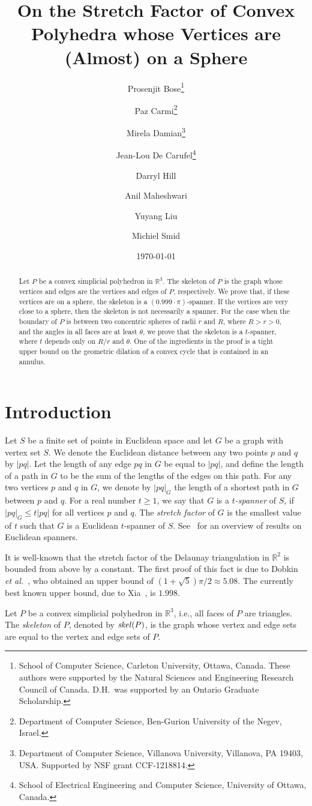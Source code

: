 \documentclass[12pt]{article}
\title{On the Stretch Factor of Convex Polyhedra whose Vertices are 
      (Almost) on a Sphere}
\author{
Prosenjit Bose\thanks{School of Computer Science, Carleton University, 
    Ottawa, Canada. These authors were supported by the 
    Natural Sciences and Engineering Research Council of Canada. 
    D.H.\ was supported by an Ontario Graduate Scholarship.}
\and 
Paz Carmi\thanks{Department of Computer Science, Ben-Gurion University 
   of the Negev, Israel.} 
\and 
Mirela Damian\thanks{Department of Computer Science, Villanova 
   University, Villanova, PA 19403, USA. Supported by NSF grant 
   CCF-1218814.}
\and 
Jean-Lou De Carufel\thanks{School of Electrical Engineering and 
    Computer Science, University of Ottawa, Canada.} 
\and  
Darryl Hill\footnotemark[1] 
\and 
Anil Maheshwari\footnotemark[1] 
\and
Yuyang Liu\footnotemark[1] 
\and 
Michiel Smid\footnotemark[1] 
}
\date{\today}
\newcommand{\IR}{\mathbb{R}}
\newcommand{\skel}{\mathord{\it skel}}
\begin{document}
 

\maketitle 

\begin{abstract} 
Let $P$ be a convex simplicial polyhedron in $\IR^3$. The skeleton of 
$P$ is the graph whose vertices and edges are the vertices and edges 
of $P$, respectively. We prove that, if these vertices are on a 
sphere, the skeleton is a $(0.999 \cdot \pi)$-spanner. If the 
vertices are very close to a sphere, then the skeleton is not 
necessarily a spanner. For the case when the boundary of $P$ is between 
two concentric spheres of radii $r$ and $R$, where $R>r>0$, and the 
angles in all faces are at least $\theta$, we prove that the skeleton 
is a $t$-spanner, where $t$ depends only on $R/r$ and $\theta$.  
One of the ingredients in the proof is a tight upper bound on 
the geometric dilation of a convex cycle that is contained in an 
annulus. 
\end{abstract} 


\section{Introduction}
Let $S$ be a finite set of points in Euclidean space and let $G$ be a 
graph with vertex set $S$. We denote the Euclidean distance between any 
two points $p$ and $q$ by $|pq|$. Let the length of any edge $pq$ in $G$ 
be equal to $|pq|$, and define the length of a path in $G$ to be the sum 
of the lengths of the edges on this path. For any two vertices $p$ and 
$q$ in $G$, we denote by $|pq|_G$ the length of a shortest path in $G$ 
between $p$ and $q$. For a real number $t \geq 1$, we say that $G$ is a 
\emph{$t$-spanner} of $S$, if $|pq|_G \leq t |pq|$ for all vertices $p$ 
and $q$. The \emph{stretch factor} of $G$ is the smallest value of $t$ 
such that $G$ is a Euclidean $t$-spanner of $S$. See~\cite{ns-gsn-07} 
for an overview of results on Euclidean spanners.

It is well-known that the stretch factor of the Delaunay triangulation
in $\IR^2$ is bounded from above by a constant. The first proof of this
fact is due to Dobkin \emph{et al.}~\cite{dfs-dgaag-90}, who obtained
an upper bound of $(1+\sqrt{5})\pi/2 \approx 5.08$. The currently best
known upper bound, due to Xia~\cite{x-sfdtl-13}, is $1.998$.

Let $P$ be a convex simplicial polyhedron in $\IR^3$, i.e., all faces
of $P$ are triangles. The \emph{skeleton} of $P$, denoted by $\skel(P)$, 
is the graph whose vertex and edge sets are equal to the vertex and edge 
sets of $P$. 
\end{document}
